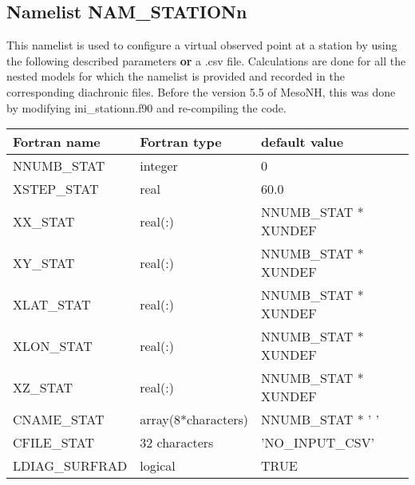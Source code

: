 \subsection{Namelist NAM\_STATIONn }\label{s:namstationn}
%
This namelist is used to configure a virtual observed point at a station by using the following described parameters \textbf{or} a .csv file. Calculations are done for all the nested models for which the namelist is provided and recorded in the corresponding diachronic files. Before the version 5.5 of MesoNH, this was done by modifying ini\_stationn.f90 and re-compiling the code.

\vspace{0.5cm}
\begin{longtable} {|p{}|p{}|p{}|}
\hline
Fortran name &  Fortran type & default value \\
\hline 
\endhead
\hline
\endfoot
NNUMB\_STAT    & integer &  0 \\
XSTEP\_STAT    & real  &  60.0 \\
XX\_STAT       & real(:)  &  NNUMB\_STAT * XUNDEF \\
XY\_STAT       & real(:)  &  NNUMB\_STAT * XUNDEF  \\
XLAT\_STAT     & real(:)  &  NNUMB\_STAT * XUNDEF \\
XLON\_STAT     & real(:)  &  NNUMB\_STAT * XUNDEF \\
XZ\_STAT       & real(:)  &  NNUMB\_STAT * XUNDEF \\
CNAME\_STAT    & array(8*characters)  &  NNUMB\_STAT * ' ' \\
CFILE\_STAT    & 32 characters  &  'NO\_INPUT\_CSV' \\
LDIAG\_SURFRAD & logical & TRUE \\
\end{longtable}
